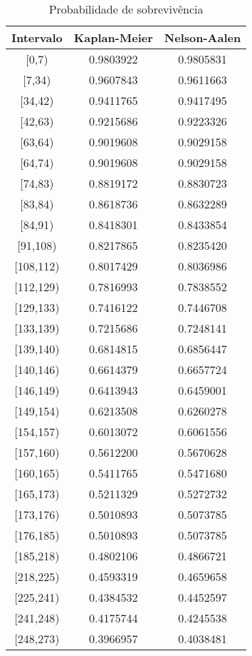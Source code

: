 \documentclass[
]{article}
\begin{document}
\begin{table}[H]

\caption{\label{tab:unnamed-chunk-13}Probabilidade de sobrevivência}
\centering
\begin{tabular}[t]{ccc}
\toprule
Intervalo & Kaplan-Meier & Nelson-Aalen\\
\midrule
{}[0,7) & 0.9803922 & 0.9805831\\
{}[7,34) & 0.9607843 & 0.9611663\\
{}[34,42) & 0.9411765 & 0.9417495\\
{}[42,63) & 0.9215686 & 0.9223326\\
{}[63,64) & 0.9019608 & 0.9029158\\
\addlinespace
{}[64,74) & 0.9019608 & 0.9029158\\
{}[74,83) & 0.8819172 & 0.8830723\\
{}[83,84) & 0.8618736 & 0.8632289\\
{}[84,91) & 0.8418301 & 0.8433854\\
{}[91,108) & 0.8217865 & 0.8235420\\
\addlinespace
{}[108,112) & 0.8017429 & 0.8036986\\
{}[112,129) & 0.7816993 & 0.7838552\\
{}[129,133) & 0.7416122 & 0.7446708\\
{}[133,139) & 0.7215686 & 0.7248141\\
{}[139,140) & 0.6814815 & 0.6856447\\
\addlinespace
{}[140,146) & 0.6614379 & 0.6657724\\
{}[146,149) & 0.6413943 & 0.6459001\\
{}[149,154) & 0.6213508 & 0.6260278\\
{}[154,157) & 0.6013072 & 0.6061556\\
{}[157,160) & 0.5612200 & 0.5670628\\
\addlinespace
{}[160,165) & 0.5411765 & 0.5471680\\
{}[165,173) & 0.5211329 & 0.5272732\\
{}[173,176) & 0.5010893 & 0.5073785\\
{}[176,185) & 0.5010893 & 0.5073785\\
{}[185,218) & 0.4802106 & 0.4866721\\
\addlinespace
{}[218,225) & 0.4593319 & 0.4659658\\
{}[225,241) & 0.4384532 & 0.4452597\\
{}[241,248) & 0.4175744 & 0.4245538\\
{}[248,273) & 0.3966957 & 0.4038481\\

\end{tabular}
\end{table}
\end{document}
